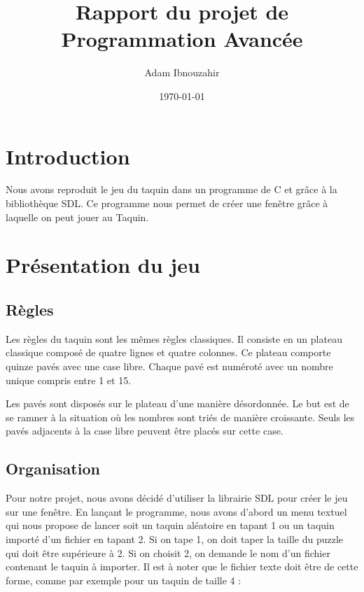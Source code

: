 \documentclass[11pt]{article}
\author{Adam Ibnouzahir}
\date{\today}
\title{Rapport du projet de Programmation Avancée}
\begin{document}
\maketitle
\tableofcontents


\section{Introduction}
\label{sec:orgc9dddc6}

Nous avons reproduit le jeu du taquin dans un programme de C et grâce à la bibliothèque SDL. Ce programme nous permet de créer une fenêtre grâce à laquelle on peut jouer au Taquin.

\section{Présentation du jeu}
\label{sec:org2d04509}

\subsection{Règles}
\label{sec:org6c4477b}

Les règles du taquin sont les mêmes règles classiques. Il consiste en un plateau classique composé de quatre lignes et quatre colonnes. Ce plateau comporte quinze pavés avec une case libre. Chaque pavé est numéroté avec un nombre unique compris entre 1 et 15.

Les pavés sont disposés sur le plateau d'une manière désordonnée. Le but est de se ramner à la situation où les nombres sont triés de manière croissante. Seuls les pavés adjacents à la case libre peuvent être placés sur cette case.

\subsection{Organisation}
\label{sec:orgaa6d45a}

Pour notre projet, nous avons décidé d'utiliser la librairie SDL pour créer le jeu sur une fenêtre. En lançant le programme, nous avons d'abord un menu textuel qui nous propose de lancer soit un taquin aléatoire en tapant 1 ou un taquin importé d'un fichier en tapant 2. Si on tape 1, on doit taper la taille du puzzle qui doit être supérieure à 2. Si on choisit 2, on demande le nom d'un fichier contenant le taquin à importer. Il est à noter que le fichier texte doit être de cette forme, comme par exemple pour un taquin de taille 4 :
\end{document}
